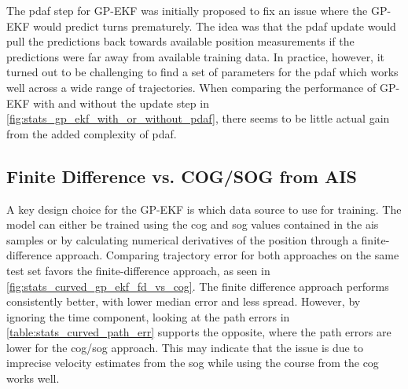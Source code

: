 The \acrshort{pdaf} step for GP-EKF was initially proposed to fix an issue where the GP-EKF would predict turns prematurely. The idea was that the \acrshort{pdaf} update would pull the predictions back towards available position measurements if the predictions were far away from available training data. In practice, however, it turned out to be challenging to find a set of parameters for the \acrshort{pdaf} which works well across a wide range of trajectories. When comparing the performance of GP-EKF with and without the update step in \cref{fig:stats_gp_ekf_with_or_without_pdaf}, there seems to be little actual gain from the added complexity of \acrshort{pdaf}.  


\subsection{Finite Difference vs. COG/SOG from AIS}
A key design choice for the GP-EKF is which data source to use for training. The model can either be trained using the \acrshort{cog} and \acrshort{sog} values contained in the \acrshort{ais} samples or by calculating numerical derivatives of the position through a finite-difference approach. Comparing trajectory error for both approaches on the same test set favors the finite-difference approach, as seen in \cref{fig:stats_curved_gp_ekf_fd_vs_cog}. The finite difference approach performs consistently better, with lower median error and less spread. However, by ignoring the time component, looking at the path errors in \cref{table:stats_curved_path_err} supports the opposite, where the path errors are lower for the \acrshort{cog}/\acrshort{sog} approach. This may indicate that the issue is due to imprecise velocity estimates from the \acrshort{sog} while using the course from the \acrshort{cog} works well.
